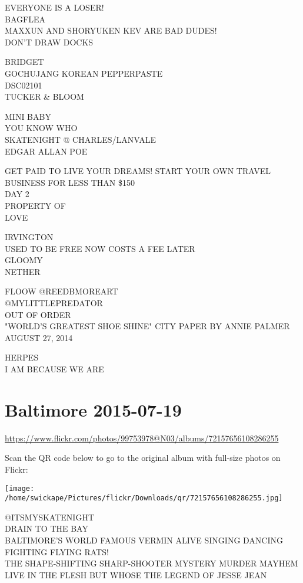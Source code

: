 \documentclass[10pt,letterpaper]{article}
\begin{document}
EVERYONE IS A LOSER!\\
BAGFLEA\\
MAXXUN AND SHORYUKEN KEV ARE BAD DUDES!\\
DON'T DRAW DOCKS

BRIDGET\\
GOCHUJANG KOREAN PEPPERPASTE\\
DSC02101\\
TUCKER \& BLOOM

MINI BABY\\
YOU KNOW WHO\\
SKATENIGHT @ CHARLES/LANVALE\\
EDGAR ALLAN POE

GET PAID TO LIVE YOUR DREAMS!  START YOUR OWN TRAVEL BUSINESS FOR LESS THAN \$150\\
DAY 2\\
PROPERTY OF\\
LOVE

IRVINGTON\\
USED TO BE FREE NOW COSTS A FEE LATER\\
GLOOMY\\
NETHER

FLOOW @REEDBMOREART\\
@MYLITTLEPREDATOR\\
OUT OF ORDER\\
"WORLD'S GREATEST SHOE SHINE" CITY PAPER BY ANNIE PALMER AUGUST 27, 2014

HERPES\\
I AM BECAUSE WE ARE


\section*{Baltimore 2015-07-19}

\url{https://www.flickr.com/photos/99753978@N03/albums/72157656108286255}

Scan the QR code below to go to the original album with full-size photos on Flickr:

\texttt{[image: /home/swickape/Pictures/flickr/Downloads/qr/72157656108286255.jpg]}


@ITSMYSKATENIGHT\\
DRAIN TO THE BAY\\
BALTIMORE'S WORLD FAMOUS VERMIN ALIVE SINGING DANCING FIGHTING FLYING RATS!\\
THE SHAPE{-}SHIFTING SHARP{-}SHOOTER MYSTERY MURDER MAYHEM LIVE IN THE FLESH BUT WHOSE THE LEGEND OF JESSE JEAN
\end{document}
